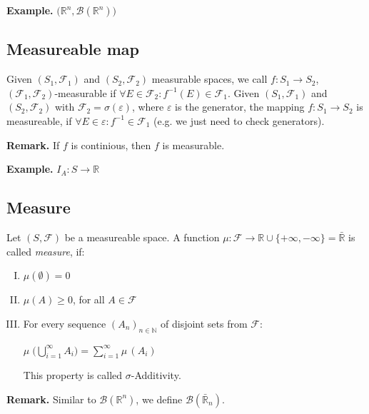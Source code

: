 \documentclass{scrarticle}
\begin{document}
\vspace{0.3cm}

\textbf{Example.} $\big (\mathbb{R}^n, \mathcal{B}(\mathbb{R}^n) \big )$

\subsection{Measureable map}
Given $(S_1, \mathcal{F}_1)$ and $(S_2, \mathcal{F}_2)$ measurable spaces, we call $f: S_1 \to S_2$, $(\mathcal{F}_1, \mathcal{F}_2)$-measurable if $\forall E \in \mathcal{F}_2: f^{-1}(E) \in \mathcal{F}_1$. Given $(S_1, \mathcal{F}_1)$ and $(S_2, \mathcal{F}_2)$ with $\mathcal{F}_2 = \sigma(\varepsilon)$, where $\varepsilon$ is the generator, the mapping $f:S_1 \to S_2$ is measureable, if $\forall E \in \varepsilon:f^{-1} \in \mathcal{F}_1$ (e.g. we just need to check generators).

\vspace{0.3cm}

\textbf{Remark.} If $f$ is continious, then $f$ is measurable.

\vspace{0.3cm}

\textbf{Example.} $I_A: S \to \mathbb{R}$


\subsection{Measure}

Let $(S, \mathcal{F})$ be a measureable space. A function $\mu: \mathcal{F} \to \mathbb{R} \cup \{+ \infty, -\infty\} = \bar{\mathbb{R}}$ is called \textit{measure}, if:

\begin{enumerate}[I.]
    \item $\mu(\emptyset) = 0$
    \item $\mu(A) \geq 0$, for all $A \in \mathcal{F}$
    \item For every sequence $(A_n)_{n \in \mathbb{N}}$ of disjoint sets from $\mathcal{F}$:
        
        $\mu \; \big (\bigcup_{i=1}^\infty A_i \big ) = \sum_{i=1}^\infty \mu \, (A_i) $
        
        This property is called $\sigma$-Additivity.
\end{enumerate}

\vspace{0.3cm}

\textbf{Remark.} Similar to $\mathcal{B}(\mathbb{R}^n)$, we define $\mathcal{B}(\bar{\mathbb{R}}_n)$.
\end{document}

